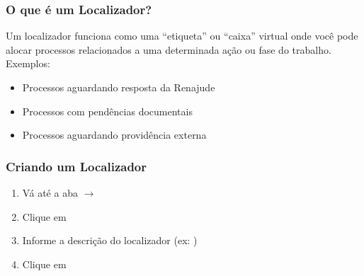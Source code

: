 \documentclass[letterpaper,10pt,brazil]{sphinxmanual}
\begin{document}
\subsubsection{O que é um Localizador?}
\label{\detokenize{projud_50_localizador:o-que-e-um-localizador}}
\sphinxAtStartPar
Um localizador funciona como uma “etiqueta” ou “caixa” virtual onde você pode alocar processos relacionados a uma determinada ação ou fase do trabalho. Exemplos:
\begin{itemize}
\item {} 
\sphinxAtStartPar
Processos aguardando resposta da Renajude

\item {} 
\sphinxAtStartPar
Processos com pendências documentais

\item {} 
\sphinxAtStartPar
Processos aguardando providência externa

\end{itemize}


\subsubsection{Criando um Localizador}
\label{\detokenize{projud_50_localizador:criando-um-localizador}}\begin{enumerate}
%
\item {} 
\sphinxAtStartPar
Vá até a aba  \(\rightarrow\) 

\item {} 
\sphinxAtStartPar
Clique em 

\item {} 
\sphinxAtStartPar
Informe a descrição do localizador (ex: )

\item {} 
\sphinxAtStartPar
Clique em 

\end{enumerate}
\end{document}
